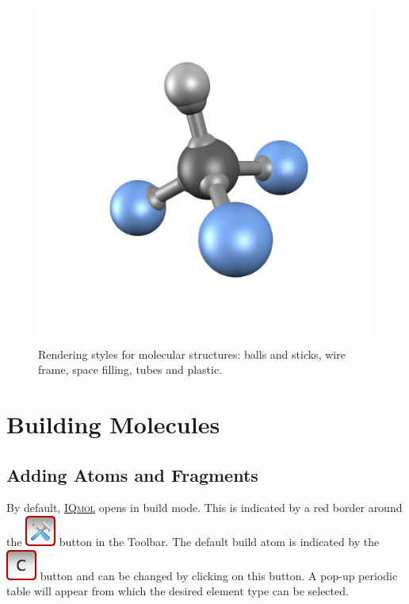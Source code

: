\documentclass[a4paper,12pt]{article}
\newcommand{\iqmol}{\href{http://iqmol.org}{{\scshape IQmol}}}
\begin{document}
\begin{figure}[h]
\begin{center}
\includegraphics[scale=0.18]{figures/CHF3-moly.png}
\caption{Rendering styles for molecular structures: balls and sticks, wire frame,
space filling, tubes and plastic.}
\label{fig:styles}
\end{center}
\end{figure}



\newpage
\section{Building Molecules}


\subsection{Adding Atoms and Fragments}

By default, \iqmol{} opens in build mode.  This is indicated by a red border
around the \includegraphics[scale=0.40]{figures/BuildButton.png} button in the
Toolbar.   The default build atom is indicated by the
\includegraphics[scale=0.40]{figures/BuildAtomButton.png} button and can be changed
by clicking on this button.  A pop-up periodic table will appear from which the
desired element type can be selected.
\end{document}
